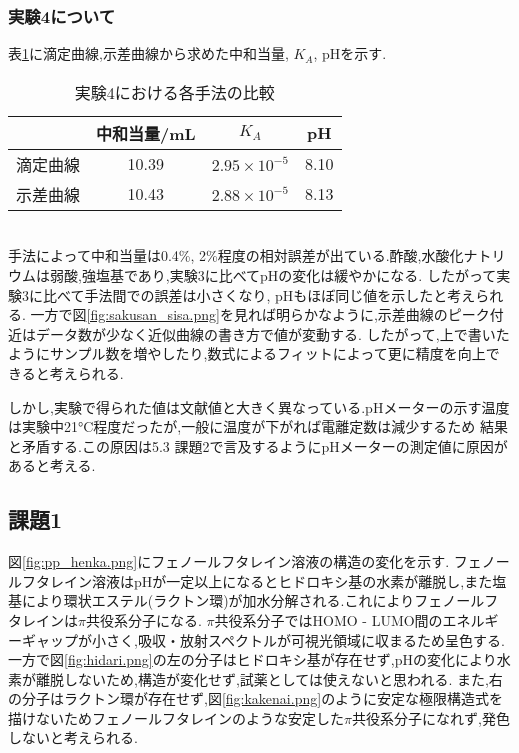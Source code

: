 \subsubsection{実験4について}
表\ref{tab:hikaku2}に滴定曲線,示差曲線から求めた中和当量, $K_A$, pHを示す.
\begin{table}[htbp]
   \caption{実験4における各手法の比較}
   \label{tab:hikaku2}
   \centering
   \begin{tabular}{lccc}
     \hline
     &中和当量/\si{\milli L}&$K_A$&pH\\
     \hline \hline
     滴定曲線&10.39&$2.95\times10^{-5}$&8.10\\
     示差曲線&10.43&$2.88\times10^{-5}$&8.13\\
     \hline
   \end{tabular}
\end{table}\\
手法によって中和当量は0.4\%, 2\%程度の相対誤差が出ている.酢酸,水酸化ナトリウムは弱酸,強塩基であり,実験3に比べてpHの変化は緩やかになる.
したがって実験3に比べて手法間での誤差は小さくなり, pHもほぼ同じ値を示したと考えられる.
一方で図\ref{fig:sakusan_sisa.png}を見れば明らかなように,示差曲線のピーク付近はデータ数が少なく近似曲線の書き方で値が変動する.
したがって,上で書いたようにサンプル数を増やしたり,数式によるフィットによって更に精度を向上できると考えられる.

しかし,実験で得られた値は文献値\cite{rikougaku}と大きく異なっている.pHメーターの示す温度は実験中21\si{\degreeCelsius}程度だったが,一般に温度が下がれば電離定数は減少するため
結果と矛盾する.この原因は5.3 課題2で言及するようにpHメーターの測定値に原因があると考える.
\subsection{課題1}
図\ref{fig:pp_henka.png}にフェノールフタレイン溶液の構造の変化を示す.
フェノールフタレイン溶液はpHが一定以上になるとヒドロキシ基の水素が離脱し,また塩基により環状エステル(ラクトン環)が加水分解される.これによりフェノールフタレインは$\pi$共役系分子になる. $\pi$共役系分子ではHOMO - LUMO間のエネルギーギャップが小さく,吸収・放射スペクトルが可視光領域に収まるため呈色する.\cite{Muranaka}
一方で図\ref{fig:hidari.png}の左の分子はヒドロキシ基が存在せず,pHの変化により水素が離脱しないため,構造が変化せず,試薬としては使えないと思われる.
また,右の分子はラクトン環が存在せず,図\ref{fig:kakenai.png}のように安定な極限構造式を描けないためフェノールフタレインのような安定した$\pi$共役系分子になれず,発色しないと考えられる.
